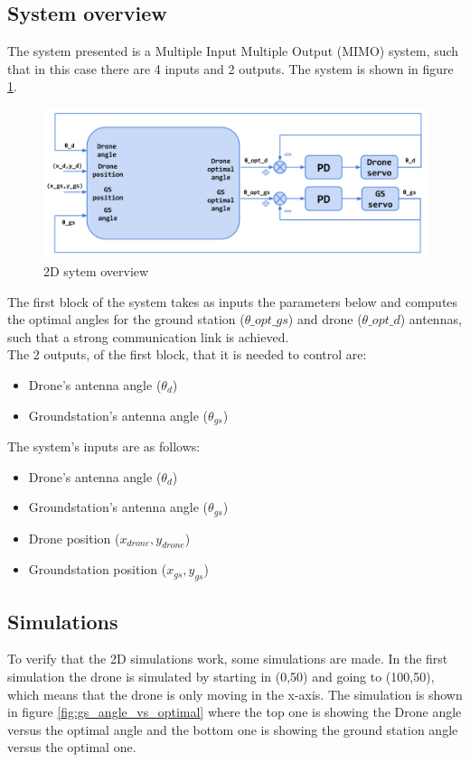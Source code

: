 \subsection{System overview}
The system presented is a Multiple Input Multiple Output (MIMO) system, such that in this case there are 4 inputs and 2 outputs. The system is shown in figure \ref{fig:2d_system}. 

\begin{figure}[h]
	\centering
	\includegraphics[scale=0.42]{figures/2d_system.png}
	\caption{2D sytem overview}
	\label{fig:2d_system}
\end{figure}
The first block of the system takes as inputs the parameters below and computes the optimal angles for the ground station ($\theta\_opt\_gs$) and drone ($\theta\_opt\_d$) antennas, such that a strong communication link is achieved. \\

\noindent The 2 outputs, of the first block, that it is needed to control are:
\begin{itemize}
	\item Drone's antenna angle ($\theta_{d}$)
	\item Groundstation's antenna angle ($\theta_{gs}$)
\end{itemize}

\noindent The system's inputs are as follows:
\begin{itemize}
	\item Drone's antenna angle ($\theta_{d}$)
	\item Groundstation's antenna angle ($\theta_{gs}$)
	\item Drone position ($x_{drone},y_{drone}$)
	\item Groundstation position ($x_{gs},y_{gs}$)
\end{itemize}   

\subsection{Simulations}
To verify that the 2D simulations work, some simulations are made. In the first simulation the drone is simulated by starting in (0,50) and going to (100,50), which means that the drone is only moving in the x-axis. The simulation is shown in figure \ref{fig:gs_angle_vs_optimal} where the top one is showing the Drone angle versus the optimal angle and the bottom one is showing the ground station angle versus the optimal one. 

